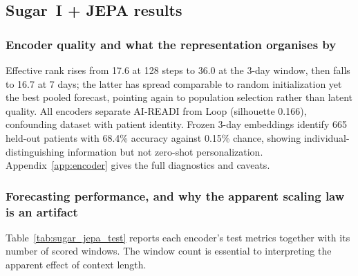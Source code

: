 \documentclass[11pt,a4paper]{article}
\begin{document}
\subsection{Sugar~I + JEPA results}
\label{sec:jepa_results}

\subsubsection{Encoder quality and what the representation organises by}

Effective rank rises from 17.6 at 128 steps to 36.0 at the 3-day window, then falls to 16.7 at 7 days; the latter has spread comparable to random initialization yet the best pooled forecast, pointing again to population selection rather than latent quality.
All encoders separate AI-READI from Loop (silhouette 0.166), confounding dataset with patient identity.
Frozen 3-day embeddings identify 665 held-out patients with 68.4\% accuracy against 0.15\% chance, showing individual-distinguishing information but not zero-shot personalization.
Appendix~\ref{app:encoder} gives the full diagnostics and caveats.

\subsubsection{Forecasting performance, and why the apparent scaling law is an artifact}

Table~\ref{tab:sugar_jepa_test} reports each encoder's test metrics together with its number of scored windows.
The window count is essential to interpreting the apparent effect of context length.
\end{document}
